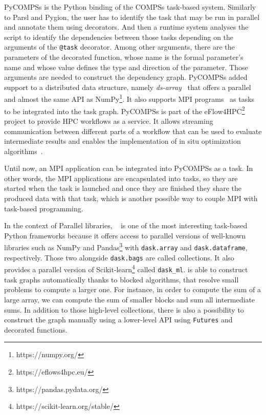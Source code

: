 PyCOMPSs\cite{tejedor2017pycompss, ramoncortes_programming_2020_pycompss} is the Python binding of the COMPSs\cite{tejedor_compss} task-based system. 
Similarly to Parsl and Pygion, the user has to identify the task that may be run in parallel and annotate them using decorators. And then a runtime system analyses the script to identify the dependencies between those tasks depending on the arguments of the \texttt{@task} decorator. Among other arguments, there are the parameters of the decorated function, whose name is the formal parameter’s name and whose value defines the type and direction of the parameter. Those arguments are needed to construct the dependency graph. 
PyCOMPSs added support to a distributed data structure, namely \textit{ds-array}~\cite{cidfuentes_dislib_2019_pycompss} that offers a parallel and almost the same API as NumPy\footnote{https://numpy.org/}. 
It also supports MPI programs~\cite{elshazly_performance_2020_pycompss} as tasks to be integrated into the task graph. 
PyCOMPSs is part of the eFlow4HPC\footnote{https://eflows4hpc.eu/} project to provide HPC workflows as a service. It allows streaming communication between different parts of a workflow that can be used to evaluate intermediate results and enables the implementation of in situ optimization algorithms~\cite{ejarque_enabling_2022}. 

Until now, an MPI application can be integrated into PyCOMPSs as a task. In other words, the MPI applications are encapsulated into tasks, so they are started when the task is launched and once they are finished they share the produced data with that task, which is another possible way to couple MPI with task-based programming.

In the context of Parallel libraries, \dask~\cite{rocklin_dask_2015} is one of the most interesting task-based Python frameworks because it offers access to parallel versions of well-known libraries such as NumPy and Pandas\footnote{https://pandas.pydata.org/} with \texttt{dask.array} and \texttt{dask.dataframe}, respectively. 
Those two alongside \texttt{dask.bags} are called collections. It also provides a parallel version of Scikit-learn\footnote{https://scikit-learn.org/stable/} called \texttt{dask\_ml}. 
\dask is able to construct task graphs automatically thanks to blocked algorithms, that resolve small problems to compute a larger one. For instance, in order to compute the sum of a large array, we can compute the sum of smaller blocks and sum all intermediate sums.
In addition to those high-level collections, there is also a possibility to construct the graph manually using a lower-level API using \texttt{Futures} and decorated functions. 

